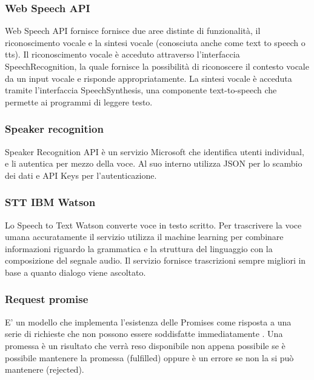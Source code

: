 \subsubsection{Web Speech API}
Web Speech API fornisce fornisce due aree distinte di funzionalità, il riconoscimento vocale e la sintesi vocale (conosciuta anche come text to speech o tts).
Il riconoscimento vocale è acceduto attraverso l'interfaccia SpeechRecognition, la quale fornisce la possibilità di riconoscere il contesto vocale da un input vocale e risponde appropriatamente. 
La sintesi vocale è acceduta tramite l'interfaccia SpeechSynthesis, una componente text-to-speech che permette ai programmi di leggere testo.

\subsubsection{Speaker recognition}
Speaker Recognition API è un servizio Microsoft che identifica utenti individual, e li autentica per mezzo della voce. Al suo interno utilizza JSON per lo scambio dei dati e API Keys per l'autenticazione.

\subsubsection{STT IBM Watson}
Lo Speech to Text Watson converte voce in testo scritto. Per trascrivere la voce umana accuratamente il servizio utilizza il machine learning per combinare informazioni riguardo la grammatica e la struttura del linguaggio con la composizione del segnale audio. Il servizio fornisce trascrizioni sempre migliori in base a quanto dialogo viene ascoltato.

\subsubsection{Request promise}
E' un modello che implementa l'esistenza delle Promises come risposta a una serie di richieste che non possono essere soddisfatte immediatamente . Una promessa è un risultato che verrà reso disponibile non appena possibile se è possibile mantenere la promessa (fulfilled) oppure è un errore se non la si può mantenere (rejected).